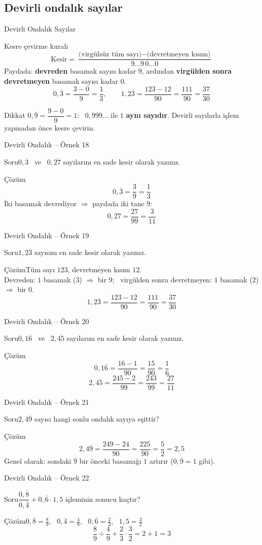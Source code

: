 \documentclass[aspectratio=169,11pt,handout]{beamer}
\newcommand{\soru}[3]{%
\begin{frame}{#1}
  \begin{block}{Soru}\large #2\end{block}
  \pause
  \begin{exampleblock}{Çözüm}\large #3\end{exampleblock}
\end{frame}}
\newcommand{\ab}[1]{\overline{#1}}
\begin{document}
\subsection{Devirli ondalık sayılar}
\begin{frame}{Devirli Ondalık Sayılar}
\begin{block}{Kesre çevirme kuralı}
\[\text{Kesir}=\frac{\text{(virgülsüz tüm sayı)}-\text{(devretmeyen kısım)}}{9\ldots9\,0\ldots0}\]
\vspace{-4pt}
Paydada: \textbf{devreden} basamak sayısı kadar \(9\), ardından \textbf{virgülden sonra devretmeyen} basamak sayısı kadar \(0\).
\[0{,}\ab{3}=\frac{3-0}{9}=\frac{1}{3},\qquad 1{,}2\ab{3}=\frac{123-12}{90}=\frac{111}{90}=\frac{37}{30}\]
\end{block}
\begin{alertblock}{Dikkat}
\(0{,}\ab{9}=\dfrac{9-0}{9}=1\): \ \(0{,}999\ldots\) ile \(1\) \textbf{aynı sayıdır}. \quad Devirli sayılarla işlem yapmadan önce kesre çevirin.
\end{alertblock}
\end{frame}

\soru{Devirli Ondalık -- Örnek 18}
{\(0{,}\ab{3}\) \ ve \ \(0{,}\ab{27}\) sayılarını en sade kesir olarak yazınız.}
{\[0{,}\ab{3}=\frac{3}{9}=\frac{1}{3}\]
İki basamak devrediyor \(\Rightarrow\) paydada iki tane \(9\):
\[0{,}\ab{27}=\frac{27}{99}=\frac{3}{11}\]}

\soru{Devirli Ondalık -- Örnek 19}
{\(1{,}2\ab{3}\) sayısını en sade kesir olarak yazınız.}
{Tüm sayı \(123\), devretmeyen kısım \(12\).\\
Devreden: \(1\) basamak (\(3\)) \(\Rightarrow\) bir \(9\); \ virgülden sonra devretmeyen: \(1\) basamak (\(2\)) \(\Rightarrow\) bir \(0\).
\[1{,}2\ab{3}=\frac{123-12}{90}=\frac{111}{90}=\frac{37}{30}\]}

\soru{Devirli Ondalık -- Örnek 20}
{\(0{,}1\ab{6}\) \ ve \ \(2{,}\ab{45}\) sayılarını en sade kesir olarak yazınız.}
{\[0{,}1\ab{6}=\frac{16-1}{90}=\frac{15}{90}=\frac{1}{6}\]
\[2{,}\ab{45}=\frac{245-2}{99}=\frac{243}{99}=\frac{27}{11}\]}

\soru{Devirli Ondalık -- Örnek 21}
{\(2{,}4\ab{9}\) sayısı hangi sonlu ondalık sayıya eşittir?}
{\[2{,}4\ab{9}=\frac{249-24}{90}=\frac{225}{90}=\frac{5}{2}=2{,}5\]
Genel olarak: sondaki \(\ab{9}\) bir önceki basamağı \(1\) artırır (\(0{,}\ab{9}=1\) gibi).}

\soru{Devirli Ondalık -- Örnek 22}
{\(\dfrac{0{,}\ab{8}}{0{,}\ab{4}}+0{,}\ab{6}\cdot 1{,}5\) işleminin sonucu kaçtır?}
{\(0{,}\ab{8}=\frac{8}{9}\), \ \(0{,}\ab{4}=\frac{4}{9}\), \ \(0{,}\ab{6}=\frac{2}{3}\), \ \(1{,}5=\frac{3}{2}\)
\[\frac{8}{9}\div\frac{4}{9}+\frac{2}{3}\cdot\frac{3}{2}=2+1=3\]}
\end{document}
